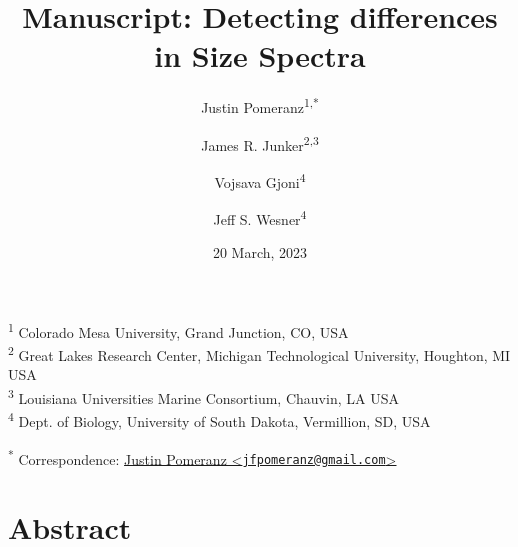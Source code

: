 \documentclass[
]{article}
\title{Manuscript: Detecting differences in Size Spectra}
\author{Justin Pomeranz\textsuperscript{1,*} \and James R.
Junker\textsuperscript{2,3} \and Vojsava
Gjoni\textsuperscript{4} \and Jeff S. Wesner\textsuperscript{4}}
\date{20 March, 2023}
\begin{document}
\maketitle

{
\setcounter{tocdepth}{2}
\tableofcontents
}
\textsuperscript{1} Colorado Mesa University, Grand Junction, CO, USA\\
\textsuperscript{2} Great Lakes Research Center, Michigan Technological
University, Houghton, MI USA\\
\textsuperscript{3} Louisiana Universities Marine Consortium, Chauvin,
LA USA\\
\textsuperscript{4} Dept. of Biology, University of South Dakota,
Vermillion, SD, USA

\textsuperscript{*} Correspondence:
\href{mailto:jfpomeranz@gmail.com}{Justin Pomeranz
\textless{}\href{mailto:jfpomeranz@gmail.com}{\nolinkurl{jfpomeranz@gmail.com}}\textgreater{}}

\hypertarget{abstract}{%
\section{Abstract}\label{abstract}}
\end{document}
